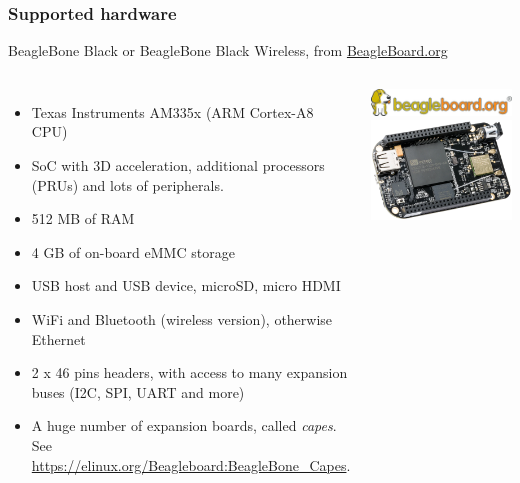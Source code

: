 \begin{frame}
\frametitle{Supported hardware}
  BeagleBone Black or BeagleBone Black Wireless, from
\href{https://beagleboard.org}{BeagleBoard.org}
  \begin{columns}
    \footnotesize
    \begin{itemize}
      \item Texas Instruments AM335x (ARM Cortex-A8 CPU)
      \item SoC with 3D acceleration, additional processors
        (PRUs) and lots of peripherals.
      \item 512 MB of RAM
      \item 4 GB of on-board eMMC storage
      \item USB host and USB device, microSD, micro HDMI
      \item WiFi and Bluetooth (wireless version), otherwise Ethernet
      \item 2 x 46 pins headers, with access to many expansion buses
        (I2C, SPI, UART and more)
      \item A huge number of expansion boards, called {\em capes}.
        See \url{https://elinux.org/Beagleboard:BeagleBone_Capes}.
    \end{itemize}
    \begin{center}
      \includegraphics[width=\textwidth]{slides/beagleboneblack-board/beagle_logo_326x60.png}\\
      \includegraphics[width=\textwidth]{slides/beagleboneblack-board/beagleboneblack.png}
    \end{center}
  \end{columns}
\end{frame}
